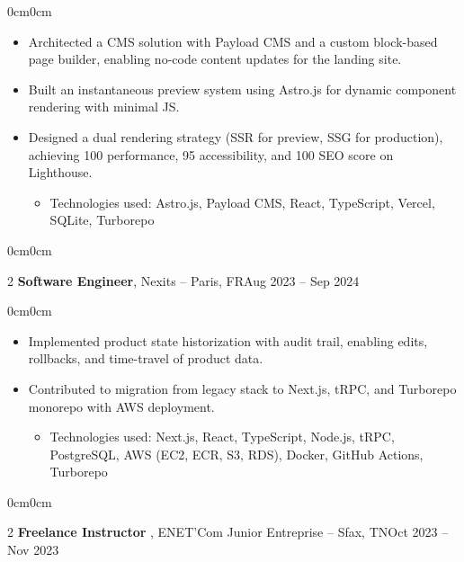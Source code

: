 \documentclass[10pt, a4paper]{article}
\newenvironment{highlights}{\begin{itemize}[topsep=0.10 cm, parsep=0.10 cm, partopsep=0pt, itemsep=0pt, leftmargin=0 cm + 10pt]}{\end{itemize}}
\newenvironment{highlightsforbulletentries}{\begin{itemize}[topsep=0.10 cm, parsep=0.10 cm, partopsep=0pt, itemsep=0pt, leftmargin=10pt]}{\end{itemize}}
\newenvironment{onecolentry}{\begin{adjustwidth}{0cm}{0cm}}{\end{adjustwidth}}
\newenvironment{twocolentry}[2][]{\onecolentry \def\secondColumn{#2} \setcolumnwidth{\fill, 4.5 cm} \begin{paracol}{2}}{\switchcolumn \raggedleft \secondColumn \end{paracol} \end{onecolentry}}
\begin{document}
\vspace{0.10 cm}
\begin{onecolentry}
  \begin{highlights}
  \item Architected a CMS solution with Payload CMS and a custom block-based page builder, enabling no-code content updates for the landing site.
  \item Built an instantaneous preview system using Astro.js for dynamic component rendering with minimal JS.
  \item Designed a dual rendering strategy (SSR for preview, SSG for production), achieving 100 performance, 95 accessibility, and 100 SEO score on Lighthouse.
    \begin{highlightsforbulletentries}
    \item Technologies used: Astro.js, Payload CMS, React, TypeScript, Vercel, SQLite, Turborepo
    \end{highlightsforbulletentries}
  \end{highlights}
\end{onecolentry}

\vspace{0.2 cm}
\begin{twocolentry}{Aug 2023 -- Sep 2024}
\textbf{Software Engineer}, Nexits -- Paris, FR\end{twocolentry}

\vspace{0.10 cm}
\begin{onecolentry}
  \begin{highlights}
  \item Implemented product state historization with audit trail, enabling edits, rollbacks, and time-travel of product data.
  \item Contributed to migration from legacy stack to Next.js, tRPC, and Turborepo monorepo with AWS deployment.
    \begin{highlightsforbulletentries}
    \item Technologies used: Next.js, React, TypeScript, Node.js, tRPC, PostgreSQL, AWS (EC2, ECR, S3, RDS), Docker, GitHub Actions, Turborepo
    \end{highlightsforbulletentries}
  \end{highlights}
\end{onecolentry}

\vspace{0.2 cm}
\begin{twocolentry}{Oct 2023 -- Nov 2023}
\textbf{Freelance Instructor }, ENET’Com Junior Entreprise -- Sfax, TN\end{twocolentry}
\end{document}

